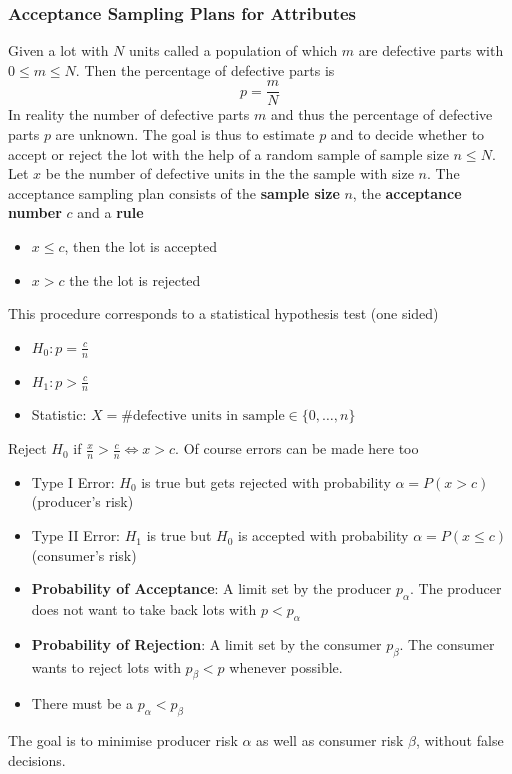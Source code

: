\documentclass[11pt]{article}
\theoremstyle{definition}
\begin{document}
\subsubsection{Acceptance Sampling Plans for Attributes}
Given a lot with $N$ units called a population of which $m$ are defective parts with $0\leq m\leq N$. Then the percentage of defective parts is
\begin{equation*}
	p = \frac{m}{N}
\end{equation*}
In reality the number of defective parts $m$ and thus the percentage of defective parts $p$ are unknown. The goal is thus to estimate $p$ and to decide whether to accept or reject the lot with the help of a random sample of sample size $n\leq N$. Let $x$ be the number of defective units in the the sample with size $n$.
The acceptance sampling plan consists of the \textbf{sample size} $n$, the \textbf{acceptance number} $c$ and a \textbf{rule}
\begin{itemize}[nosep]
	\item $x\leq c$, then the lot is accepted
	\item $x>c$ the the lot is rejected
\end{itemize}
This procedure corresponds to a statistical hypothesis test (one sided)
\begin{itemize}
	\item $H_0: p=\frac{c}{n}$
	\item $H_1: p>\frac{c}{n}$
	\item Statistic: $X = \#\text{defective units in sample}\in\{0,\dots,n\}$
\end{itemize}
Reject $H_0$ if $\frac{x}{n}>\frac{c}{n}\Leftrightarrow x>c$. Of course errors can be made here too
\begin{itemize}
	\item Type I Error: $H_0$ is true but gets rejected with probability $\alpha = P(x>c)$ (producer's risk)
	\item Type II Error: $H_1$ is true but $H_0$ is accepted with probability $\alpha = P(x\leq c)$ (consumer's risk)
\end{itemize}

\begin{itemize}
	\item \textbf{Probability of Acceptance}: A limit set by the producer $p_{\alpha}$. The producer does not want to take back lots with $p<p_{\alpha}$
	\item \textbf{Probability of Rejection}: A limit set by the consumer $p_{\beta}$. The consumer wants to reject lots with $p_{\beta}<p$ whenever possible.
	\item There must be a $p_{\alpha} < p_{\beta}$
\end{itemize}
The goal is to minimise producer risk $\alpha$ as well as consumer risk $\beta$, without false decisions.
\end{document}
